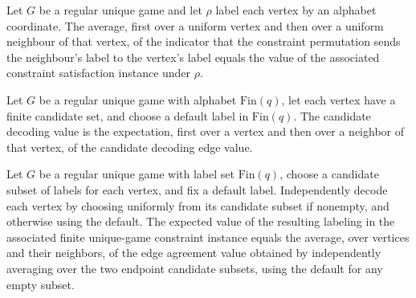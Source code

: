 \begin{theorem}
\label{FABL.RegularUniqueGame.neighborhoodSuccessValue_eq_cspValue}
\leanok
{}
Let $G$ be a regular unique game and let $\rho$ label each vertex by an alphabet
coordinate. The average, first over a uniform vertex and then over a uniform neighbour
of that vertex, of the indicator that the constraint permutation sends the neighbour's
label to the vertex's label equals the value of the associated constraint satisfaction
instance under $\rho$.
\end{theorem}

\begin{definition}
\label{FABL.RegularUniqueGame.candidateDecodingValue}
\leanok
{}
Let $G$ be a regular unique game with alphabet $\text{Fin}(q)$, let each vertex have a
finite candidate set, and choose a default label in $\text{Fin}(q)$. The candidate
decoding value is the expectation, first over a vertex and then over a neighbor of that
vertex, of the candidate decoding edge value.
\end{definition}

\begin{theorem}
\label{FABL.RegularUniqueGame.pmfExpectation_candidateDecodingAssignmentLaw_value}
\leanok
{}
Let $G$ be a regular unique game with label set $\text{Fin}(q)$, choose a candidate
subset of labels for each vertex, and fix a default label. Independently decode each
vertex by choosing uniformly from its candidate subset if nonempty, and otherwise using
the default. The expected value of the resulting labeling in the associated finite
unique-game constraint instance equals the average, over vertices and their neighbors,
of the edge agreement value obtained by independently averaging over the two endpoint
candidate subsets, using the default for any empty subset.
\end{theorem}

